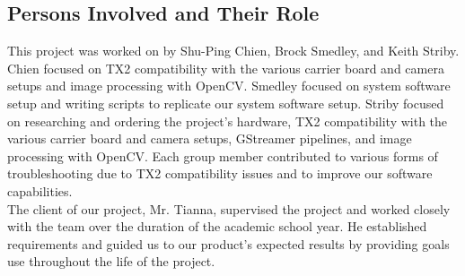 \subsection{Persons Involved and Their Role}

This project was worked on by Shu-Ping Chien, Brock Smedley, and Keith Striby. Chien 
focused on TX2 compatibility with the various carrier board and camera setups and image 
processing with OpenCV. Smedley focused on system software setup and writing scripts to 
replicate our system software setup. Striby focused on researching and ordering 
the project's hardware, TX2 compatibility with the 
various carrier board and camera setups, GStreamer pipelines, and image processing with 
OpenCV. Each group member contributed to various forms of troubleshooting due to 
TX2 compatibility issues and to improve our software capabilities.  \\

The client of our project, Mr. Tianna, supervised the project and worked closely with the 
team over the duration of the 
academic school year. He established requirements and guided us to our 
product's expected results by providing goals use throughout the life of the project. \\